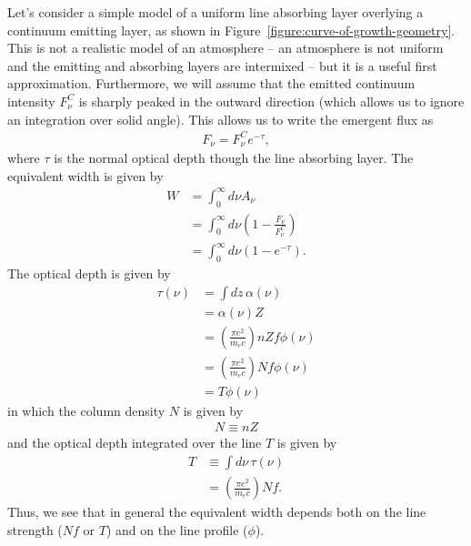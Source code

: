 Let's consider a simple model of a uniform line absorbing
layer overlying a continuum emitting layer, as shown in Figure~\ref{figure:curve-of-growth-geometry}.
This is not a
realistic model of an atmosphere -- an atmosphere is not
uniform and the emitting and absorbing layers are intermixed
-- but it is a useful first approximation. Furthermore, we
will assume that the emitted continuum intensity $F_\nu^C$ is sharply peaked
in the outward direction (which allows us to ignore an
integration over solid angle). This allows us to write the
emergent flux as
\begin{align}
F_\nu = F_\nu^Ce^{-\tau},
\end{align}
where $\tau$ is the normal optical depth though the line
absorbing layer. 
The equivalent width is given by
\begin{align}
W 
&= \int_0^\infty\!\!\!d\nu A_\nu\\
&= \int_0^\infty\!\!\!d\nu \left(1 - \frac{F_\nu}{F_\nu^C}\right)\\
&= \int_0^\infty\!\!\!d\nu \left(1 - e^{-\tau}\right).
\end{align}
The optical depth is given by
\begin{align}
\tau(\nu) &= \int\!\! dz\, \alpha(\nu)\\
&=\alpha(\nu) Z\\
&= \left(\frac{\pi e^2}{m_e c}\right) nZ f \phi(\nu)\\
&= \left(\frac{\pi e^2}{m_e c}\right) Nf \phi(\nu)\\
&= T \phi(\nu)
\end{align}
in which the column density $N$ is given by
\begin{align}
N \equiv nZ
\end{align}
and the optical depth integrated over the line $T$ is given by
\begin{align}
T &\equiv \int\!\!d\nu\,\tau(\nu)\\
&=\left(\frac{\pi e^2}{m_e c}\right) Nf.
\end{align}
Thus, we see that in general the equivalent width depends
both on the line strength ($Nf$ or $T$) and on the line profile
($\phi$).

